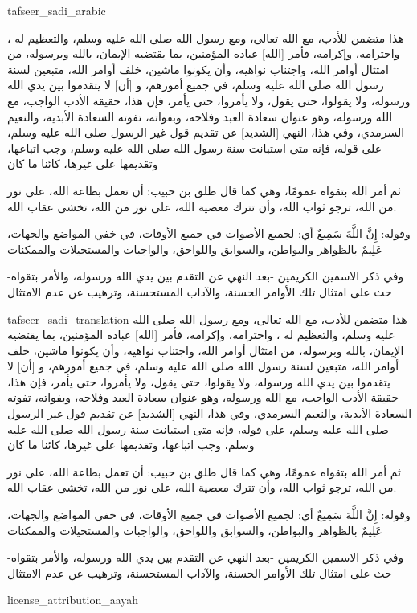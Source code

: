\begin{taggedblock}{tafseer_sadi_arabic}
\begin{Arabic}
هذا متضمن للأدب، مع الله تعالى، ومع رسول الله صلى الله عليه وسلم، والتعظيم له ، واحترامه، وإكرامه، فأمر
[الله]
عباده المؤمنين، بما يقتضيه الإيمان، بالله وبرسوله، من امتثال أوامر الله، واجتناب نواهيه، وأن يكونوا ماشين، خلف أوامر الله، متبعين لسنة رسول الله صلى الله عليه وسلم، في جميع أمورهم، و
[أن]
لا يتقدموا بين يدي الله ورسوله، ولا يقولوا، حتى يقول، ولا يأمروا، حتى يأمر، فإن هذا، حقيقة الأدب الواجب، مع الله ورسوله، وهو عنوان سعادة العبد وفلاحه، وبفواته، تفوته السعادة الأبدية، والنعيم السرمدي، وفي هذا، النهي
[الشديد]
عن تقديم قول غير الرسول صلى الله عليه وسلم، على قوله، فإنه متى استبانت سنة رسول الله صلى الله عليه وسلم، وجب اتباعها، وتقديمها على غيرها، كائنا ما كان

ثم أمر الله بتقواه عمومًا، وهي كما قال طلق بن حبيب: أن تعمل بطاعة الله، على نور من الله، ترجو ثواب الله، وأن تترك معصية الله، على نور من الله، تخشى عقاب الله.

وقوله:
{ إِنَّ اللَّهَ سَمِيعٌ }
أي: لجميع الأصوات في جميع الأوقات، في خفي المواضع والجهات،
{ عَلِيمٌ }
بالظواهر والبواطن، والسوابق واللواحق، والواجبات والمستحيلات والممكنات

وفي ذكر الاسمين الكريمين -بعد النهي عن التقدم بين يدي الله ورسوله، والأمر بتقواه- حث على امتثال تلك الأوامر الحسنة، والآداب المستحسنة، وترهيب عن عدم الامتثال
\end{Arabic}
\end{taggedblock}
\begin{taggedblock}{tafseer_sadi_translation}
هذا متضمن للأدب، مع الله تعالى، ومع رسول الله صلى الله عليه وسلم، والتعظيم له ، واحترامه، وإكرامه، فأمر
[الله]
عباده المؤمنين، بما يقتضيه الإيمان، بالله وبرسوله، من امتثال أوامر الله، واجتناب نواهيه، وأن يكونوا ماشين، خلف أوامر الله، متبعين لسنة رسول الله صلى الله عليه وسلم، في جميع أمورهم، و
[أن]
لا يتقدموا بين يدي الله ورسوله، ولا يقولوا، حتى يقول، ولا يأمروا، حتى يأمر، فإن هذا، حقيقة الأدب الواجب، مع الله ورسوله، وهو عنوان سعادة العبد وفلاحه، وبفواته، تفوته السعادة الأبدية، والنعيم السرمدي، وفي هذا، النهي
[الشديد]
عن تقديم قول غير الرسول صلى الله عليه وسلم، على قوله، فإنه متى استبانت سنة رسول الله صلى الله عليه وسلم، وجب اتباعها، وتقديمها على غيرها، كائنا ما كان

ثم أمر الله بتقواه عمومًا، وهي كما قال طلق بن حبيب: أن تعمل بطاعة الله، على نور من الله، ترجو ثواب الله، وأن تترك معصية الله، على نور من الله، تخشى عقاب الله.

وقوله:
{ إِنَّ اللَّهَ سَمِيعٌ }
أي: لجميع الأصوات في جميع الأوقات، في خفي المواضع والجهات،
{ عَلِيمٌ }
بالظواهر والبواطن، والسوابق واللواحق، والواجبات والمستحيلات والممكنات

وفي ذكر الاسمين الكريمين -بعد النهي عن التقدم بين يدي الله ورسوله، والأمر بتقواه- حث على امتثال تلك الأوامر الحسنة، والآداب المستحسنة، وترهيب عن عدم الامتثال
\end{taggedblock}
\begin{taggedblock}{license_attribution_aayah}

\end{taggedblock}
\begin{comment}
Please use the following for footnotes:- Sample\footnoteQ{Text of Qur'an footnote goes here.}.
Sample\footnoteT{Text of Tafseer footnote goes here.}.
\end{comment}
